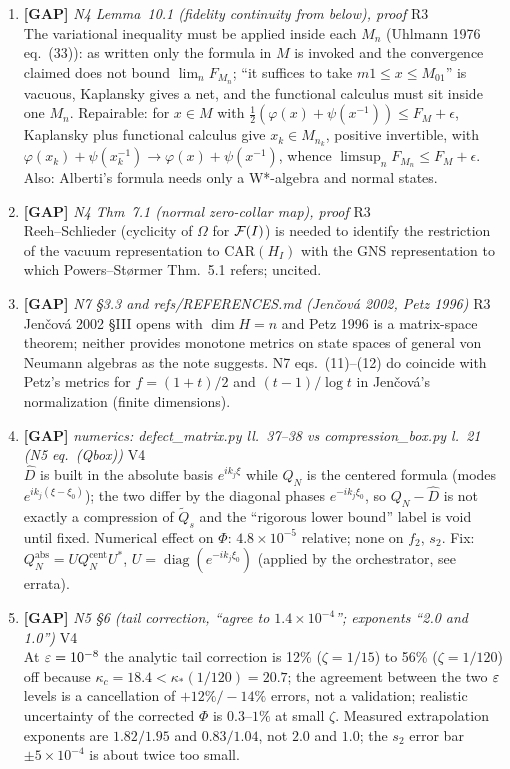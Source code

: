 \documentclass[11pt]{article}
\begin{document}
\begin{enumerate}[leftmargin=1.6em,itemsep=6pt]
\item \textbf{[GAP]} \emph{N4 Lemma~10.1 (fidelity continuity from below), proof} \hfill\textsc{R3}\\ The variational inequality must be applied inside each \(M_n\) (Uhlmann 1976 eq.~(33)): as written only the formula in \(M\) is invoked and the convergence claimed does not bound \(\lim_nF_{M_n}\); ``it suffices to take \(m1\le x\le M_01\)'' is vacuous, Kaplansky gives a net, and the functional calculus must sit inside one \(M_n\). Repairable: for \(x\in M\) with \(\frac12(\varphi(x)+\psi(x^{-1}))\le F_M+\epsilon\), Kaplansky plus functional calculus give \(x_k\in M_{n_k}\), positive invertible, with \(\varphi(x_k)+\psi(x_k^{-1})\to\varphi(x)+\psi(x^{-1})\), whence \(\limsup_nF_{M_n}\le F_M+\epsilon\). Also: Alberti's formula needs only a W*-algebra and normal states.
\item \textbf{[GAP]} \emph{N4 Thm~7.1 (normal zero-collar map), proof} \hfill\textsc{R3}\\ Reeh--Schlieder (cyclicity of \(\Omega\) for \(\mathcal F(I)\)) is needed to identify the restriction of the vacuum representation to \(\mathrm{CAR}(H_I)\) with the GNS representation to which Powers--St\o rmer Thm.~5.1 refers; uncited.
\item \textbf{[GAP]} \emph{N7 \S3.3 and refs/REFERENCES.md (Jen\v cov\'a 2002, Petz 1996)} \hfill\textsc{R3}\\ Jen\v cov\'a 2002 \S III opens with \(\dim H=n\) and Petz 1996 is a matrix-space theorem; neither provides monotone metrics on state spaces of general von Neumann algebras as the note suggests. N7 eqs.\ (11)--(12) do coincide with Petz's metrics for \(f=(1+t)/2\) and \((t-1)/\log t\) in Jen\v cov\'a's normalization (finite dimensions).
\item \textbf{[GAP]} \emph{numerics: defect\_matrix.py ll.~37--38 vs compression\_box.py l.~21 (N5 eq.\ (Qbox))} \hfill\textsc{V4}\\ \(\widehat D\) is built in the absolute basis \(e^{ik_j\xi}\) while \(Q_N\) is the centered formula (modes \(e^{ik_j(\xi-\xi_0)}\)); the two differ by the diagonal phases \(e^{-ik_j\xi_0}\), so \(Q_N-\widehat D\) is not exactly a compression of \(\widetilde Q_s\) and the ``rigorous lower bound'' label is void until fixed. Numerical effect on \(\Phi\): \(4.8\times10^{-5}\) relative; none on \(f_2\), \(s_2\). Fix: \(Q_N^{\mathrm{abs}}=UQ_N^{\mathrm{cent}}U^*\), \(U=\operatorname{diag}(e^{-ik_j\xi_0})\) (applied by the orchestrator, see errata).
\item \textbf{[GAP]} \emph{N5 \S6 (tail correction, ``agree to \(1.4\times10^{-4}\)''; exponents ``2.0 and 1.0'')} \hfill\textsc{V4}\\ At \(\varepsilon=10^{-8}\) the analytic tail correction is 12\% (\(\zeta=1/15\)) to 56\% (\(\zeta=1/120\)) off because \(\kappa_c=18.4<\kappa_*(1/120)=20.7\); the agreement between the two \(\varepsilon\) levels is a cancellation of \(+12\%/-14\%\) errors, not a validation; realistic uncertainty of the corrected \(\Phi\) is \(0.3\)--\(1\%\) at small \(\zeta\). Measured extrapolation exponents are \(1.82/1.95\) and \(0.83/1.04\), not \(2.0\) and \(1.0\); the \(s_2\) error bar \(\pm5\times10^{-4}\) is about twice too small.

\end{enumerate}
\end{document}
